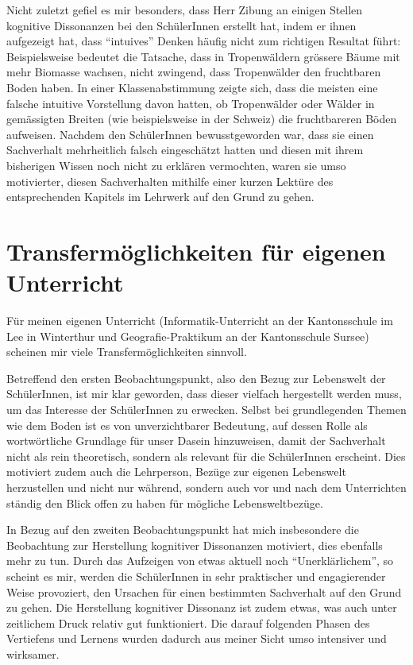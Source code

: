 Nicht zuletzt gefiel es mir besonders, dass Herr Zibung an einigen Stellen kognitive Dissonanzen bei den SchülerInnen erstellt hat, indem er ihnen aufgezeigt hat, dass ``intuives'' Denken häufig nicht zum richtigen Resultat führt: Beispielsweise bedeutet die Tatsache, dass in Tropenwäldern grössere Bäume mit mehr Biomasse wachsen, nicht zwingend, dass Tropenwälder den fruchtbaren Boden haben. In einer Klassenabstimmung zeigte sich, dass die meisten eine falsche intuitive Vorstellung davon hatten, ob Tropenwälder oder Wälder in gemässigten Breiten (wie beispielsweise in der Schweiz) die fruchtbareren Böden aufweisen. Nachdem den SchülerInnen bewusstgeworden war, dass sie einen Sachverhalt mehrheitlich falsch eingeschätzt hatten und diesen mit ihrem bisherigen Wissen noch nicht zu erklären vermochten, waren sie umso motivierter, diesen Sachverhalten mithilfe einer kurzen Lektüre des entsprechenden Kapitels im Lehrwerk auf den Grund zu gehen.

 \section{Transfermöglichkeiten für eigenen Unterricht}
 
 Für meinen eigenen Unterricht (Informatik-Unterricht an der Kantonsschule im Lee in Winterthur und Geografie-Praktikum an der Kantonsschule Sursee) scheinen mir viele Transfermöglichkeiten sinnvoll. 
 
 Betreffend den ersten Beobachtungspunkt, also den Bezug zur Lebenswelt der SchülerInnen, ist mir klar geworden, dass dieser vielfach hergestellt werden muss, um das Interesse der SchülerInnen zu erwecken. Selbst bei grundlegenden Themen wie dem Boden ist es von unverzichtbarer Bedeutung, auf dessen Rolle als wortwörtliche Grundlage für unser Dasein hinzuweisen, damit der Sachverhalt nicht als rein theoretisch, sondern als relevant für die SchülerInnen erscheint. Dies motiviert zudem auch die Lehrperson, Bezüge zur eigenen Lebenswelt herzustellen und nicht nur während, sondern auch vor und nach dem Unterrichten ständig den Blick offen zu haben für mögliche Lebensweltbezüge.
 
 In Bezug auf den zweiten Beobachtungspunkt hat mich insbesondere die Beobachtung zur Herstellung kognitiver Dissonanzen motiviert, dies ebenfalls mehr zu tun. Durch das Aufzeigen von etwas aktuell noch ``Unerklärlichem'', so scheint es mir, werden die SchülerInnen in sehr praktischer und engagierender Weise provoziert, den Ursachen für einen bestimmten Sachverhalt auf den Grund zu gehen. Die Herstellung kognitiver Dissonanz ist zudem etwas, was auch unter zeitlichem Druck relativ gut funktioniert. Die darauf folgenden Phasen des Vertiefens und Lernens wurden dadurch aus meiner Sicht umso intensiver und wirksamer. 
 
